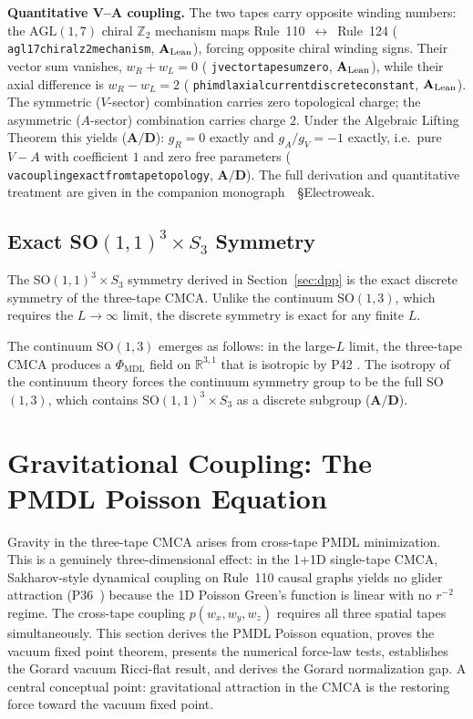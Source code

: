 \documentclass[11pt]{article}
\theoremstyle{remark}
\newcommand{\PHIMDL}{\Phi_{\mathrm{MDL}}}
\newcommand{\lean}[1]{%
  \penalty-100
  \begingroup\def\_{\textunderscore\allowbreak}\texttt{#1}\endgroup}
\newcommand{\CatAL}{\ensuremath{\textbf{A}_{\rm Lean}}}
\newcommand{\CatAD}{\textbf{A/D}}
\newcommand{\CMCA}{\text{CMCA}}
\begin{document}
\smallskip\noindent\textbf{Quantitative V--A coupling.}\enspace
The two tapes carry opposite winding numbers: the $\mathrm{AGL}(1,7)$ chiral
$\mathbb{Z}_2$ mechanism maps Rule~110~$\leftrightarrow$~Rule~124
(\lean{agl17\_chiral\_z2\_mechanism}, $\CatAL$), forcing opposite chiral
winding signs.  Their vector sum vanishes,
$w_R + w_L = 0$ (\lean{j\_vector\_tape\_sum\_zero}, $\CatAL$), while their
axial difference is $w_R - w_L = 2$
(\lean{phimdl\_axial\_current\_discrete\_constant}, $\CatAL$).
The symmetric ($V$-sector) combination carries zero topological charge;
the asymmetric ($A$-sector) combination carries charge $2$.
Under the Algebraic Lifting Theorem this yields ($\CatAD$):
$g_R = 0$ exactly and $g_A/g_V = -1$ exactly, i.e.\ pure $V{-}A$ with
coefficient $1$ and zero free parameters
(\lean{va\_coupling\_exact\_from\_tape\_topology}, $\CatAD$).
The full derivation and quantitative treatment are given in the companion
monograph~\cite{SpivackGTECompleteFramework}~\S{Electroweak}.

\subsection{Exact SO\texorpdfstring{$(1,1)^3 \times S_3$}{(1,1)3 x S3} Symmetry}
\label{ssec:lifting_descent}

The SO$(1,1)^3 \times S_3$ symmetry derived in Section~\ref{sec:dpp} is the
exact discrete symmetry of the three-tape $\CMCA$. Unlike the continuum
SO$(1,3)$, which requires the $L \to \infty$ limit, the discrete symmetry
is exact for any finite $L$.

The continuum SO$(1,3)$ emerges as follows: in the large-$L$ limit, the
three-tape $\CMCA$ produces a $\PHIMDL$ field on $\mathbb{R}^{3,1}$ that
is isotropic by P42 \cite{SpivackPhiMDLField}. The isotropy of the
continuum theory forces the continuum symmetry group to be the full
SO$(1,3)$, which contains SO$(1,1)^3 \times S_3$ as a discrete subgroup
($\CatAD$).

\FloatBarrier

\section{Gravitational Coupling: The PMDL Poisson Equation}
\label{sec:gravity}

Gravity in the three-tape $\CMCA$ arises from cross-tape PMDL minimization.
This is a genuinely three-dimensional effect: in the 1+1D single-tape $\CMCA$,
Sakharov-style dynamical coupling on Rule~110 causal graphs yields no glider
attraction (P36~\cite{SpivackEmergentGravity}) because the 1D Poisson Green's
function is linear with no $r^{-2}$ regime.
The cross-tape coupling $p(w_x,w_y,w_z)$ requires all three spatial tapes
simultaneously.
This section derives the PMDL Poisson equation, proves the vacuum fixed
point theorem, presents the numerical force-law tests, establishes the
Gorard vacuum Ricci-flat result, and derives the Gorard normalization gap.
A central conceptual point: gravitational attraction in the $\CMCA$ is the
restoring force toward the vacuum fixed point.
\end{document}

